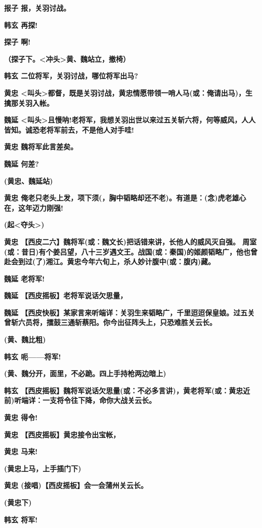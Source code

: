 \textbf{报子 报，关羽讨战。}

\textbf{韩玄 再探!}

\textbf{探子 啊!}

\textbf{（探子下。\textless{}冲头\textgreater{}黄、魏站立，撤椅）}

\textbf{韩玄 二位将军，关羽讨战，哪位将军出马?}

\textbf{黄忠
\textless{}叫头\textgreater{}都督，既是关羽讨战，黄忠情愿带领一哨人马(或：俺请出马)，生擒那关羽入帐。}

\textbf{魏延
\textless{}叫头\textgreater{}且慢呐!老将军，我想关羽出世以来过五关斩六将，何等威风，人人皆知。诚恐老将军前去，不是他人对手哇!}

\textbf{黄忠 魏将军此言差矣。}

\textbf{魏延 何差?}

\textbf{(黄忠、魏延站)}

\textbf{黄忠
俺老只老头上发，项下须(，胸中韬略却还不老)。有道是：(念)虎老雄心在，这年迈力刚强!}

\textbf{(起\textless{}夺头\textgreater{})}

\textbf{黄忠
【西皮二六】魏将军(或：魏文长)把话错来讲，长他人的威风灭自强。
周室(或：昔日)有个姜吕望，八十三岁遇文王。战国(或：秦国)的姬颜韬略广，他也曾赴会到过(了)湘江。黄忠今年六旬上，杀人妙计腹中(或：腹内)藏。}

\textbf{魏延 老将军!}

\textbf{魏延 【西皮摇板】老将军说话欠思量，}

\textbf{魏延
【西皮快板】某家言来听端详：关羽生来韬略广，千里迢迢保皇娘。过五关曾斩六员将，擂鼓三通斩蔡阳。你今出征阵头上，只恐难胜关云长。}

\textbf{(黄、魏比粗)}

\textbf{韩玄 呃------将军!}

\textbf{(黄、魏分开，面里，不必跪。四上手持枪两边暗上)}

\textbf{韩玄
【西皮摇板】魏将军说话欠思量(或：不必多言讲)，黄老将军(或：黄忠近前)听端详：一支将令往下降，命你大战关云长。}

\textbf{黄忠 得令!}

\textbf{黄忠 【西皮摇板】黄忠接令出宝帐，}

\textbf{黄忠 马来!}

\textbf{(黄忠上马，上手插门下)}

\textbf{黄忠 (接唱)【西皮摇板】会一会蒲州关云长。}

\textbf{(黄忠下)}

\textbf{韩玄 将军!}

